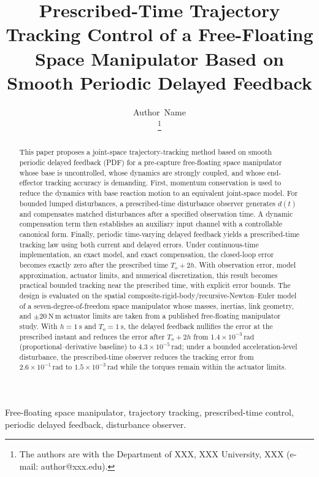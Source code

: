\documentclass[journal]{IEEEtran}
\title{Prescribed-Time Trajectory Tracking Control of a Free-Floating Space Manipulator Based on Smooth Periodic Delayed Feedback}
\author{Author~Name\\
\thanks{The authors are with the Department of XXX, XXX University, XXX (e-mail: author@xxx.edu).}}
\theoremstyle{definition}
\theoremstyle{plain}
\theoremstyle{remark}\newtheorem{remark}{Remark}[section]
\begin{document}
\maketitle
\begin{abstract}
This paper proposes a joint-space trajectory-tracking method based on smooth periodic delayed feedback (PDF) for a pre-capture free-floating space manipulator whose base is uncontrolled, whose dynamics are strongly coupled, and whose end-effector tracking accuracy is demanding. First, momentum conservation is used to reduce the dynamics with base reaction motion to an equivalent joint-space model. For bounded lumped disturbances, a prescribed-time disturbance observer generates $\hat d(t)$ and compensates matched disturbances after a specified observation time. A dynamic compensation term then establishes an auxiliary input channel with a controllable canonical form. Finally, periodic time-varying delayed feedback yields a prescribed-time tracking law using both current and delayed errors. Under continuous-time implementation, an exact model, and exact compensation, the closed-loop error becomes exactly zero after the prescribed time $T_o+2h$. With observation error, model approximation, actuator limits, and numerical discretization, this result becomes practical bounded tracking near the prescribed time, with explicit error bounds. The design is evaluated on the spatial composite-rigid-body/recursive-Newton--Euler model of a seven-degree-of-freedom space manipulator whose masses, inertias, link geometry, and $\pm20~\mathrm{N\,m}$ actuator limits are taken from a published free-floating manipulator study. With $h=1~\mathrm{s}$ and $T_o=1~\mathrm{s}$, the delayed feedback nullifies the error at the prescribed instant and reduces the error after $T_o+2h$ from $1.4\times10^{-3}\,\mathrm{rad}$ (proportional--derivative baseline) to $4.3\times10^{-5}\,\mathrm{rad}$; under a bounded acceleration-level disturbance, the prescribed-time observer reduces the tracking error from $2.6\times10^{-1}\,\mathrm{rad}$ to $1.5\times10^{-3}\,\mathrm{rad}$ while the torques remain within the actuator limits.
\end{abstract}
\begin{IEEEkeywords}
Free-floating space manipulator, trajectory tracking, prescribed-time control, periodic delayed feedback, disturbance observer.
\end{IEEEkeywords}













\end{document}
